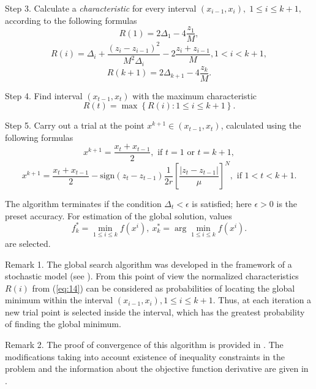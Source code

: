 \documentclass[smallcondensed]{svjour3}     %
\begin{document}
Step 3. Calculate a \textit{characteristic} for every interval $(x_{i-1}, x_i), \; 1\leq i \leq k+1,$   according to the following formulas
\[
R(1)=2\Delta_1-4\frac{z_1}{M},
\]
\begin{equation}\label{eq:14}
R(i)=\Delta_i+\frac{(z_i-z_{i-1})^2}{M^2\Delta_i}-2\frac{z_i+z_{i-1}}{M},1<i<k+1,
\end{equation}
\[
R(k+1)=2\Delta_{k+1}-4\frac{z_k}{M}.
\]

Step 4. Find interval $(x_{t-1},x_t)$ with the maximum characteristic
\[
R(t)=\max{\left\{R(i): 1 \leq i \leq k+1\right\}}.
\]

Step 5. Carry out a trial at the point $x^{k+1}\in(x_{t-1},x_t)$, calculated using the following formulas
\[
x^{k+1} = \frac{x_t+x_{t-1}}{2}, \textrm{ if } t=1 \textrm{ or } t=k+1,
\]
\[
x^{k+1} = \frac{x_t+x_{t-1}}{2} - \mathrm{sign}(z_t-z_{t-1})\frac{1}{2r}\left[\frac{\left|z_t-z_{t-1}\right|}{\mu}\right]^N, \textrm{ if } 1<t<k+1.
\]

The algorithm terminates if the condition $\Delta_t<\epsilon$ is satisfied; here $\epsilon>0$ is the preset accuracy. For estimation of the global solution, values
\[
f_k^\ast=\min_{1\leq i \leq k}f(x^i), \ x_k^\ast=\arg \min_{1\leq i \leq k}f(x^i).
\]
are selected.

Remark 1. The global search algorithm was developed in the framework of a stochastic model (see \cite{RefStrongin2000}). From this point of view the normalized characteristics $R(i)$ from (\ref{eq:14}) can be considered as probabilities of locating the global minimum within the interval  $(x_{i-1},x_i), 1\leq i \leq k+1$. Thus, at each iteration a new trial point is selected inside the interval, which has the greatest probability of finding the global minimum. 


Remark 2. The proof of convergence of this algorithm is provided in \cite{RefStrongin2000}. The modifications taking into account existence of inequality constraints in the problem and the information about the objective function derivative are given in \cite{RefBarkalov,RefGergel1996,RefGergel1997}.
\end{document}
